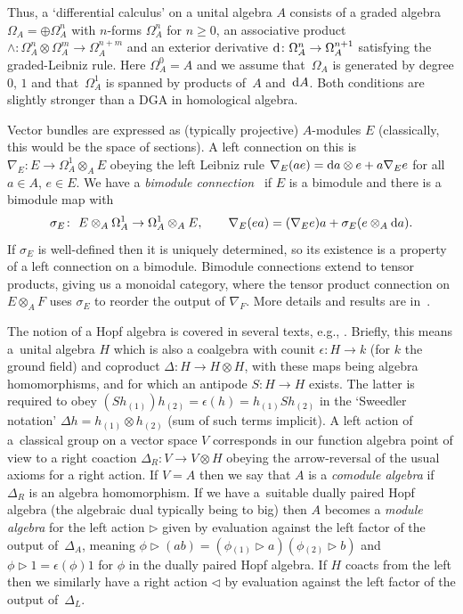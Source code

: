 \documentclass[pdftex]{sigma}
\numberwithin{equation}{section}
\newcommand{\<}{{\langle}}
\renewcommand{\>}{{\rangle}}
\newcommand{\tens}{\otimes}
\renewcommand{\o}{{}_{\scriptstyle(1)}}
\renewcommand{\t}{{}_{\scriptstyle(2)}}
\newcommand{\extd}{{\rm d}}
\newcommand{\eps}{\epsilon}
\newcommand{\la}{{\triangleright}}
\newcommand{\ra}{{\triangleleft}}
\begin{document}
Thus, a `differential calculus' on a unital algebra $A$ consists of a graded algebra $\Omega_A=\oplus\Omega^n_A$ with $n$-forms $\Omega^n_A$ for $n\geq 0$, an associative product $\wedge\colon \Omega^n_A\tens\Omega^m_A\rightarrow\Omega^{n+m}_A$ and an exterior derivative $\extd\colon \Omega^n_A\rightarrow\Omega^{n+1}_A$ satisfying the graded-Leibniz rule. Here $\Omega^0_A=A$ and we assume that~$\Omega_A$ is generated by degree $0$, $1$ and that~$\Omega^1_A$ is spanned by products of~$A$ and~$\extd A$. Both conditions are slightly stronger than a DGA in homological algebra.

Vector bundles are expressed as (typically projective) $A$-modules $E$ (classically, this would be the space of sections). A left connection on this is $\nabla_E\colon E\rightarrow\Omega^1_A\tens_AE$ obeying the left Leibniz rule $\nabla_E(ae)=\extd a\tens e+a\nabla_Ee$ for all $a\in A$, $e\in E$. We have a {\em bimodule connection}~\cite{DVM,Mou} if $E$ is a bimodule and there is a bimodule map with
\[ \sigma_E\colon \ E\tens_A\Omega^1_A\rightarrow\Omega^1_A\tens_AE, \qquad \nabla_E(ea)=(\nabla_Ee)a+\sigma_E(e\tens_A\extd a).\]
If $\sigma_E$ is well-defined then it is uniquely determined, so its existence is a property of a left connection on a bimodule. Bimodule connections extend to tensor products, giving us a monoidal category, where the tensor product connection on $E\tens_A F$ uses $\sigma_E$ to reorder the output of $\nabla_F$. More details and results are in~\cite{BegMa}.

The notion of a Hopf algebra is covered in several texts, e.g., \cite{Ma:book}. Briefly, this means a~unital algebra $H$ which is also a coalgebra with counit $\eps\colon H\to k$ (for $k$ the ground field) and coproduct $\Delta\colon H\to H\tens H$, with these maps being algebra homomorphisms, and for which an antipode $S\colon H\to H$ exists. The latter is required to obey $(Sh\o)h\t=\eps(h)=h\o Sh\t$ in the `Sweedler notation' $\Delta h=h\o\tens h\t$ (sum of such terms implicit). A left action of a~classical group on a vector space $V$ corresponds in our function algebra point of view to a right coaction $\Delta_R\colon V\to V\tens H$ obeying the arrow-reversal of the usual axioms for a right action. If $V=A$ then we say that $A$ is a {\em comodule algebra} if $\Delta_R$ is an algebra homomorphism. If we have a~suitable dually paired Hopf algebra (the algebraic dual typically being to big) then $A$ becomes a {\em module algebra} for the left action $\la$ given by evaluation against the left factor of the output of~$\Delta_A$, meaning $\phi\la(ab)=(\phi\o\la a)(\phi\t\la b)$ and $\phi\la 1=\eps(\phi)1$ for $\phi$ in the dually paired Hopf algebra. If $H$ coacts from the left then we similarly have a right action $\ra$ by evaluation against the left factor of the output of~$\Delta_L$.
\end{document}
